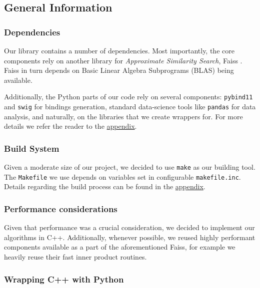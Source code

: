 
\subsection{General Information}

        
    \subsubsection{Dependencies}
    
        Our library contains a number of dependencies. Most importantly, the core components rely on 
        another library for \textit{Approximate Similarity Search}, Faiss \cite{faiss}.
        Faiss in turn depends on Basic Linear Algebra Subprograms (BLAS) being available.
        
        Additionally, the Python parts of our code rely on several components: \texttt{pybind11} and \texttt{swig}
        for bindings generation, standard data-science tools like \texttt{pandas} for data analysis, and naturally, on the
        libraries that we create wrappers for. For more details we refer the reader to the \hyperref[sec:appendices]{appendix}.
    
    \subsubsection{Build System}
        
        Given a moderate size of our project, we decided to use \texttt{make} as our building tool. The \texttt{Makefile} we use
        depends on variables set in configurable \texttt{makefile.inc}. Details regarding the build process can be found in the \hyperref[sec:appendices]{appendix}.
        
    \subsubsection{Performance considerations}
        
        Given that performance was a crucial consideration, we decided to implement our algorithms in C++.
        Additionally, whenever possible, we reused highly performant components available as a part of the aforementioned Faiss,
        for example we heavily reuse their fast inner product routines. 
        
    \subsubsection{Wrapping C++ with Python}
        
